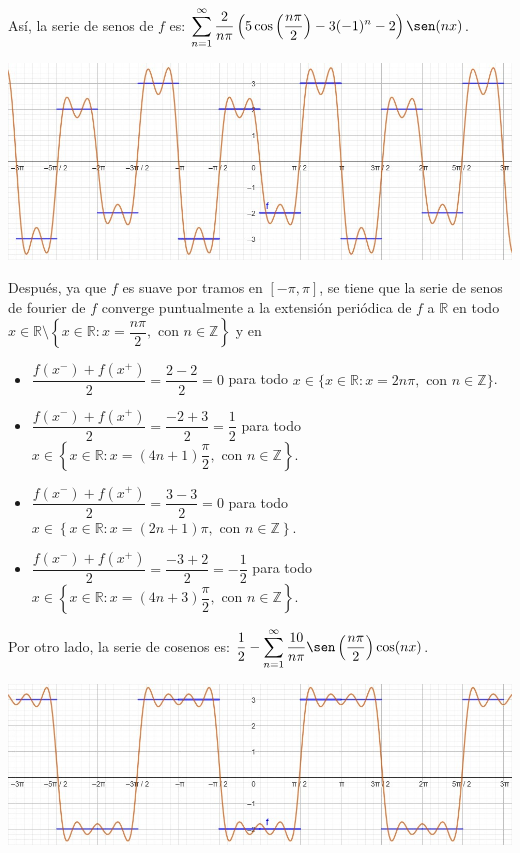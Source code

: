 \documentclass[fleqn]{article}
\newcommand{\real}{\mathbb{R}}
\newcommand{\ent}{\mathbb{Z}}
\begin{document}
\begin{enumerate}[I.]
\begin{enumerate}[(1)]
			Así, la serie de senos de $ f $ es: $ \displaystyle \sum_{n=1}^{\infty} \dfrac{2}{n \pi} \left( 5 \cos \left( \dfrac{n \pi}{2} \right) - 3(-1)^n - 2 \right) \sen (n x) $.

			\includegraphics[width=0.95\linewidth]{Ejer7s.jpg}

			Después, ya que $f$ es suave por tramos en $ [-\pi,\pi] $, se tiene que la serie de senos de fourier de $f$ converge puntualmente a la extensión periódica de $f$ a $ \real $ en todo $ x \in \real \setminus \left\lbrace x \in \real \colon x = \dfrac{n \pi}{2}, \mbox{ con } n \in \ent \right\rbrace $ y en

			\begin{itemize}
				\item $ \dfrac{f(x^-) + f(x^+)}{2} = \dfrac{2-2}{2} = 0 $ para todo $ x \in \{ x \in \real \colon x = 2n \pi, \mbox{ con } n \in \ent \} $.
				
				\item $ \dfrac{f(x^-) + f(x^+)}{2} = \dfrac{-2+3}{2} = \dfrac{1}{2} $ para todo $ x \in \left\lbrace x \in \real \colon x = (4n + 1) \dfrac{\pi}{2}, \mbox{ con } n \in \ent \right\rbrace $.
				
				\item $ \dfrac{f(x^-) + f(x^+)}{2} = \dfrac{3-3}{2} = 0 $ para todo $ x \in \left\lbrace x \in \real \colon x = (2n + 1) \pi, \mbox{ con } n \in \ent \right\rbrace $.
				
				\item $ \dfrac{f(x^-) + f(x^+)}{2} = \dfrac{-3+2}{2} = -\dfrac{1}{2} $ para todo $ x \in \left\lbrace x \in \real \colon x = (4n + 3) \dfrac{\pi}{2}, \mbox{ con } n \in \ent \right\rbrace $.
			\end{itemize}

			Por otro lado, la serie de cosenos es: $ \displaystyle \dfrac{1}{2} - \sum_{n=1}^{\infty} \dfrac{10}{n \pi} \sen \left( \dfrac{n \pi}{2} \right) \cos (n x) $.

			\includegraphics[width=0.95\linewidth]{Ejer7c.jpg}


\end{enumerate}
\end{enumerate}
\end{document}
